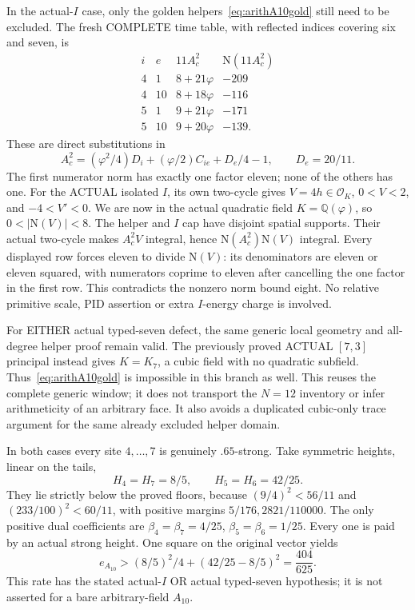 \documentclass[11pt]{article}
\begin{document}
In the actual-\(I\) case, only the golden
helpers~\eqref{eq:arithA10gold} still need
to be excluded.
The fresh COMPLETE time table, with reflected
indices covering six and seven, is
\[
 \begin{array}{c|c|c|r}
 i&e&11A_c^2&\mathrm N(11A_c^2)\\ \hline
 4&1&8+21\varphi&-209\\
 4&10&8+18\varphi&-116\\
 5&1&9+21\varphi&-171\\
 5&10&9+20\varphi&-139 .
 \end{array}
\]
These are direct substitutions in
\[
 A_c^2=(\varphi^2/4)D_i+(\varphi/2)C_{ie}+D_e/4-1,
                        \qquad D_e=20/11 .
\]
The first numerator norm has exactly one
factor eleven; none of the others has one.
For the ACTUAL isolated \(I\), its own
two-cycle gives \(V=4h\in\mathcal O_K\),
\(0<V<2\), and \(-4<V'<0\).
We are now in the actual quadratic field
\(K=\mathbb Q(\varphi)\), so
\(0<|\mathrm N(V)|<8\).
The helper and \(I\) cap have disjoint
spatial supports.
Their actual two-cycle makes \(A_c^2V\)
integral, hence
\(\mathrm N(A_c^2)\mathrm N(V)\) integral.
Every displayed row forces eleven to divide
\(\mathrm N(V)\): its denominators are
eleven or eleven squared, with numerators
coprime to eleven after cancelling the one
factor in the first row.
This contradicts the nonzero norm bound eight.
No relative primitive scale, PID assertion
or extra \(I\)-energy charge is involved.

For EITHER actual typed-seven defect, the
same generic local geometry and all-degree
helper proof remain valid.
The previously proved ACTUAL \([7,3]\)
principal instead gives \(K=K_7\), a cubic
field with no quadratic subfield.
Thus~\eqref{eq:arithA10gold} is impossible
in this branch as well.
This reuses the complete generic window;
it does not transport the \(N=12\) inventory
or infer arithmeticity of an arbitrary face.
It also avoids a duplicated cubic-only
trace argument for the same already excluded
helper domain.

In both cases every site \(4,\ldots,7\)
is genuinely \(.65\)-strong.
Take symmetric heights, linear on the tails,
\[
                  H_4=H_7=8/5,\qquad H_5=H_6=42/25 .
\]
They lie strictly below the proved floors,
because \((9/4)^2<56/11\) and
\((233/100)^2<60/11\), with positive
margins \(5/176,2821/110000\).
The only positive dual coefficients are
\(\beta_4=\beta_7=4/25\),
\(\beta_5=\beta_6=1/25\).
Every one is paid by an actual strong height.
One square on the original vector yields
\[
                       e_{A_{10}}>
                   (8/5)^2/4+(42/25-8/5)^2
                   ={\frac{404}{625}}.
\tag{A10rate}\label{eq:arithA10conditionalrate}
\]
This rate has the stated actual-\(I\) OR
actual typed-seven hypothesis; it is not
asserted for a bare arbitrary-field \(A_{10}\).
\end{document}
